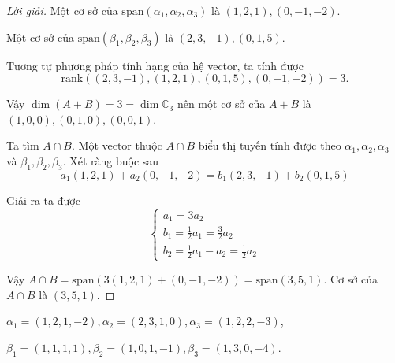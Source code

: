 \documentclass[class=linearalgebra,crop=false]{standalone}
\begin{document}
\begin{proof}[Lời giải]
    \par Một cơ sở của $\text{span}(\alpha_{1},\alpha_{2},\alpha_{3})$ là $(1,2,1), (0,-1,-2)$.
    \par Một cơ sở của $\text{span}(\beta_{1},\beta_{2},\beta_{3})$ là $(2,3,-1), (0,1,5)$.
    \par Tương tự phương pháp tính hạng của hệ vector, ta tính được
        \[ \text{rank}((2,3,-1),(1,2,1),(0,1,5),(0,-1,-2)) = 3. \]
    \par Vậy $\dim (A + B) = 3 = \dim\mathbb{C}_{3}$ nên một cơ sở của $A + B$ là $(1,0,0), (0,1,0), (0,0,1)$.
    \par Ta tìm $A\cap B$. Một vector thuộc $A\cap B$ biểu thị tuyến tính được theo $\alpha_{1}, \alpha_{2}, \alpha_{3}$ và $\beta_{1}, \beta_{2}, \beta_{3}$. Xét ràng buộc sau
        \[ a_{1}(1,2,1) + a_{2}(0,-1,-2) = b_{1}(2,3,-1) + b_{2}(0,1,5) \]
    \par Giải ra ta được
        \[
            \begin{cases}
                a_{1} = 3a_{2} \\
                b_{1} = \frac{1}{2}a_{1} = \frac{3}{2}a_{2} \\
                b_{2} = \frac{1}{2}a_{1} - a_{2} = \frac{1}{2}a_{2}
            \end{cases}
        \]
    \par Vậy $A\cap B = \text{span}(3(1,2,1) + (0,-1,-2)) = \text{span}(3,5,1)$. Cơ sở của $A\cap B$ là $(3,5,1)$.
\end{proof}

\begin{exercise}$\alpha_{1} = (1,2,1,-2), \alpha_{2} = (2,3,1,0), \alpha_{3} = (1,2,2,-3)$,
    \par $\beta_{1} = (1,1,1,1), \beta_{2} = (1,0,1,-1), \beta_{3} = (1,3,0,-4)$.
\end{exercise}
\end{document}
